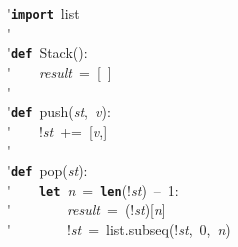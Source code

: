 \'\>\texttt{\textbf{import}}~list\\

\'\>\\

\'\>\texttt{\textbf{def}}~Stack():\\

\'\>~~~~\textit{result}~=~[~]\\

\'\>\\

\'\>\texttt{\textbf{def}}~push(\textit{st},~\textit{v}):\\

\'\>~~~~!\textit{st}~+=~[\textit{v},]\\

\'\>\\

\'\>\texttt{\textbf{def}}~pop(\textit{st}):\\

\'\>~~~~\texttt{\textbf{let}}~\textit{n}~=~\texttt{\textbf{len}}(!\textit{st})~--~1:\\

\'\>~~~~~~~~\textit{result}~=~(!\textit{st})[\textit{n}]\\

\'\>~~~~~~~~!\textit{st}~=~list.subseq(!\textit{st},~0,~\textit{n})